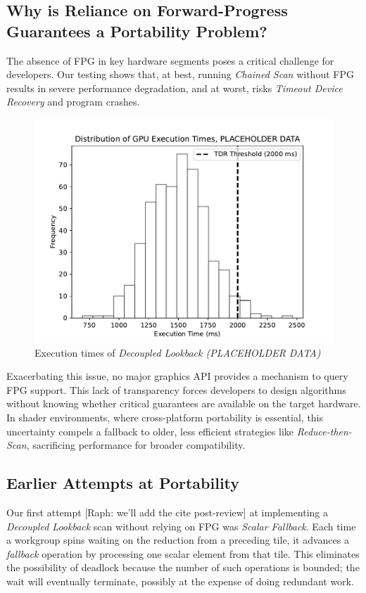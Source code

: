 \documentclass[acmsmall, manuscript, screen, review, anonymous]{acmart}
\newcommand{\raph}[1]{{\footnotesize\color{magenta}[Raph: #1]}}
\begin{document}
\subsection{Why is Reliance on Forward-Progress Guarantees a Portability Problem?}
The absence of FPG in key hardware segments poses a critical challenge for developers. Our testing shows that, at best, running \emph{Chained Scan} without FPG results in severe performance degradation, and at worst, risks \emph{Timeout Device Recovery} and program crashes.
\begin{figure}
  \centering
  \includegraphics[width=0.6\linewidth]{graphics/Figure_1.pdf}
  \caption{Execution times of \emph{Decoupled Lookback (PLACEHOLDER DATA)}}
\end{figure}
Exacerbating this issue, no major graphics API provides a mechanism to query FPG support. This lack of transparency forces developers to design algorithms without knowing whether critical guarantees are available on the target hardware. In shader environments, where cross-platform portability is essential, this uncertainty compels a fallback to older, less efficient strategies like \emph{Reduce-then-Scan}, sacrificing performance for broader compatibility.

\subsection{Earlier Attempts at Portability}
Our first attempt \raph{we'll add the cite post-review} at implementing a \emph{Decoupled Lookback} scan without relying on FPG was \emph{Scalar Fallback}. Each time a workgroup spins waiting on the reduction from a preceding tile, it advances a \emph{fallback} operation by processing one scalar element from that tile. This eliminates the possibility of deadlock because the number of such operations is bounded; the wait will eventually terminate, possibly at the expense of doing redundant work.
\end{document}
